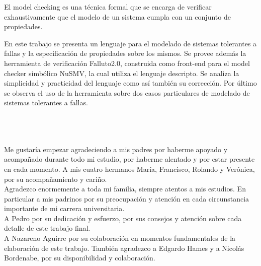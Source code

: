\documentclass[pdftex,a4paper,12pt]{book}
\begin{document}

El model checking es una t\'ecnica formal que se encarga de verificar exhaustivamente que el modelo de un sistema cumpla con un conjunto de propiedades.

En este trabajo se presenta un lenguaje para el modelado de sistemas tolerantes a fallas y la especificaci\'on de propiedades sobre los mismos. Se provee adem\'as la herramienta de verificaci\'on Falluto2.0, construida como front-end para el model checker simb\'olico NuSMV, la cual utiliza el lenguaje descripto. Se analiza la simplicidad y practicidad del lenguaje como as\'i tambi\'en su correcci\'on. Por \'ultimo se observa el uso de la herramienta sobre dos casos particulares de modelado de sistemas tolerantes a fallas.


\newpage
~\\
\newpage
\chapter*{}

Me gustar\'ia empezar agradeciendo a mis padres por haberme apoyado y acompa\~nado durante todo mi estudio, por haberme alentado y por estar presente en cada momento. A mis cuatro hermanos Mar\'ia, Francisco, Rolando y Ver\'onica, por su acompa\~namiento y cari\~no.\\

Agradezco enormemente a toda mi familia, siempre atentos a mis estudios. En particular a mis padrinos por su preocupaci\'on y atenci\'on en cada circunstancia importante de mi carrera universitaria.\\

A Pedro por su dedicaci\'on y esfuerzo, por sus consejos y atenci\'on sobre cada detalle de este trabajo final.\\

A Nazareno Aguirre por su colaboraci\'on en momentos fundamentales de la elaboraci\'on de este trabajo. Tambi\'en agradezco a Edgardo Hames y a Nicol\'as Bordenabe, por su disponibilidad y colaboraci\'on.\\
\end{document}
